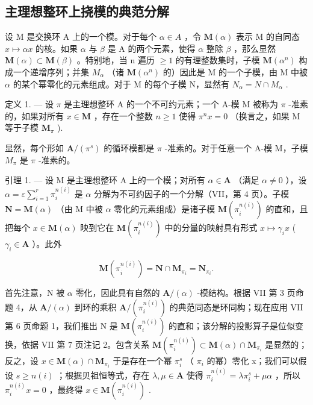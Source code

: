 \subsection{主理想整环上挠模的典范分解}

设 M 是交换环 A 上的一个模。对于每个 \(\alpha\in A\) ，令 \(\mathbf{M}(\alpha)\) 表示 M 的自同态 \(x\mapsto\alpha x\) 的核。如果 \(\alpha\) 与 \(\beta\) 是 A 的两个元素，使得 \(\alpha\) 整除 \(\beta\) ，那么显然 \(\mathbf{M}(\alpha)\subset\mathbf{M}(\beta)\) 。特别地，当 n 遍历 \(\geqslant1\) 的有理整数集时，子模 \(\mathbf{M}(\alpha^{n})\) 构成一个递增序列；并集 \(M_{\alpha}\) （诸 \(\mathbf{M}(\alpha^{n})\) 的）因此是 M 的一个子模，由 M 中被 \(\alpha\) 的某个幂零化的元素组成。对于 M 的每个子模 N，显然有 \(N_{\alpha}=N\cap M_{\alpha}\) .

定义 1. --- 设 \(\pi\) 是主理想整环 A 的一个不可约元素；一个 A-模 M 被称为 \(\pi\) -准素的，如果对所有 \(x \in \mathbf{M}\) ，存在一个整数 \(n \geqslant 1\) 使得 \(\pi^n x = 0\) （换言之，如果 M 等于子模 \(\mathbf{M}_{\pi}\) ).

显然，每个形如 \(\mathbf{A}/(\pi^{s})\) 的循环模都是 \(\pi\) -准素的。对于任意一个 A-模 M，子模 \(M_{\pi}\) 是 \(\pi\) -准素的。

引理 1. --- 设 M 是主理想整环 A 上的一个模；对所有 \(\alpha \in \mathbf{A}\) （满足 \(\alpha \neq 0\) ），设 \(\alpha = \varepsilon \sum_{i=1}^{r} \pi_i^{n(i)}\) 是 \(\alpha\) 分解为不可约因子的一个分解（VII，第 4 页）。子模 \(\mathbf{N} = \mathbf{M}(\alpha)\) （由 M 中被 \(\alpha\) 零化的元素组成）是诸子模 \(\mathbf{M}(\pi_i^{n(i)})\) 的直和，且把每个 \(x \in \mathbf{M}(\alpha)\) 映到它在 \(\mathbf{M}(\pi_i^{n(i)})\) 中的分量的映射具有形式 \(x \mapsto \gamma_i x\) ( \(\gamma_i \in \mathbf{A}\) ）。此外

\[
\mathbf {M} \left(\pi_ {i} ^ {n (i)}\right) = \mathbf {N} \cap \mathbf {M} _ {\pi_ {i}} = \mathbf {N} _ {\pi_ {i}}.
\]

首先注意，N 被 \(\alpha\) 零化，因此具有自然的 \(\mathbf{A}/(\alpha)\) -模结构。根据 VII 第 3 页命题 4，从 \(\mathbf{A}/(\alpha)\) 到环的乘积 \(\mathbf{A}/(\pi_{i}^{n(i)})\) 的典范同态是环同构；现在应用 VII 第 6 页命题 1，我们推出 N 是 \(\mathbf{M}(\pi_{i}^{n(i)})\) 的直和；该分解的投影算子是位似变换，依据 VII 第 7 页注记 2。包含关系 \(\mathbf{M}(\pi_{i}^{n(i)})\subset\mathbf{M}(\alpha)\cap\mathbf{M}_{\pi_{i}}\) 是显然的；反之，设 \(x\in\mathbf{M}(\alpha)\cap\mathbf{M}_{\pi_{i}}\) 于是存在一个幂 \(\pi_{i}^{s}\) （ \(\pi_{i}\) 的幂）零化 x；我们可以假设 \(s\geqslant n(i)\) ；根据贝祖恒等式，存在 \(\lambda,\mu\in\mathbf{A}\) 使得 \(\pi_{i}^{n(i)}=\lambda\pi_{i}^{s}+\mu\alpha\) ，所以 \(\pi_{i}^{n(i)}x=0\) ，最终得 \(x\in\mathbf{M}(\pi_{i}^{n(i)})\) .

